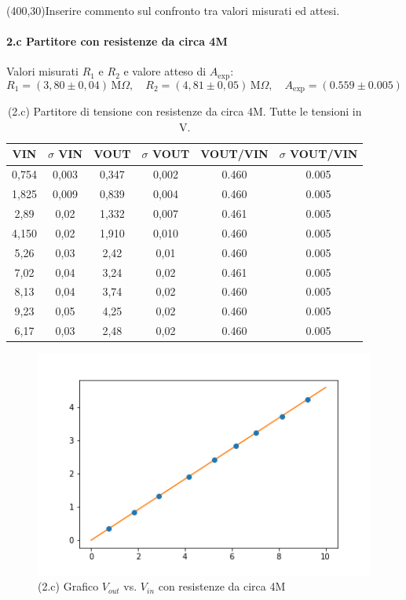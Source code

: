 \documentclass[10pt,a4paper]{article}
\begin{document}
\framebox(400,30){Inserire commento sul confronto tra valori misurati ed attesi.}


\paragraph{2.c Partitore con resistenze da circa 4M}
Valori misurati $R_1$ e $R_2$ e valore atteso di $A_\mathrm{exp}$:
\[
R_1 = ( 3,80 \pm 0,04 ) \,\mathrm{M}\Omega, \quad
R_2 = ( 4,81 \pm 0,05 ) \,\mathrm{M}\Omega, \quad
A_\mathrm{exp} = ( 0.559 \pm 0.005 ) 
\]


\begin{table}[h]
\centering
\begin{tabular}{|c|c|c|c|c|c|}
\hline 
VIN& $\sigma$ VIN  &VOUT	 & $\sigma$ VOUT& VOUT/VIN & $\sigma$ VOUT/VIN \\
\hline 
0,754 & 0,003 & 0,347 & 0,002 & 0.460 & 0.005 \\
1,825 & 0,009 & 0,839 & 0,004 & 0.460 & 0.005 \\
2,89 & 0,02 & 1,332 & 0,007 & 0.461 & 0.005\\
4,150 & 0,02 & 1,910 & 0,010 & 0.460 & 0.005\\
5,26 & 0,03 & 2,42 & 0,01 & 0.460 & 0.005\\
7,02 & 0,04 & 3,24 & 0,02 & 0.461 & 0.005\\
8,13 & 0,04 & 3,74 & 0,02 & 0.460 & 0.005\\
9,23 & 0,05 & 4,25 & 0,02 & 0.460 & 0.005\\
6,17 & 0,03 & 2,48 & 0,02 & 0.460 & 0.005\\
\hline 
\end{tabular} 
\caption{(2.c) Partitore di tensione con resistenze da circa 4M. Tutte le tensioni in V.\label{t:par2}}
\end{table}


\begin{figure}[h]
\centering
\includegraphics[scale=0.6]{Dati_2c_plot.png}

\caption{(2.c) Grafico $V_{out}$ vs. $V_{in}$ con resistenze da circa 4M \label{f:par2}}
\end{figure}
\end{document}
